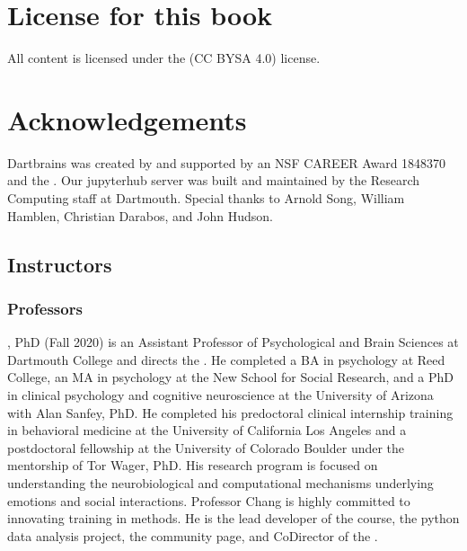 \documentclass[letterpaper,10pt,english]{sphinxmanual}
\let\sphinxpxdimen\pdfpxdimen\else\newdimen\sphinxpxdimen
\begin{document}
\chapter{License for this book}
\label{\detokenize{content/intro:license-for-this-book}}
All content is licensed under the 
(CC BY\sphinxhyphen{}SA 4.0) license.


\chapter{Acknowledgements}
\label{\detokenize{content/intro:acknowledgements}}
Dartbrains was created by  and supported by an NSF CAREER Award 1848370 and the . Our jupyterhub server was built and maintained by the Research Computing staff at Dartmouth. Special thanks to Arnold Song, William Hamblen, Christian Darabos, and John Hudson.


\section{Instructors}
\label{\detokenize{content/Instructors:instructors}}\label{\detokenize{content/Instructors::doc}}

\subsection{Professors}
\label{\detokenize{content/Instructors:professors}}
\noindent\sphinxincludegraphics[width=200\sphinxpxdimen]{{chang}.jpg}

, PhD (Fall 2020) is an Assistant Professor of Psychological and Brain Sciences at Dartmouth College and directs the . He completed a BA in psychology at Reed College, an MA in psychology at the New School for Social Research, and a PhD in clinical psychology and cognitive neuroscience at the University of Arizona with Alan Sanfey, PhD. He completed his predoctoral clinical internship training in behavioral medicine at the University of California Los Angeles and a postdoctoral fellowship at the University of Colorado Boulder under the mentorship of Tor Wager, PhD. His research program is focused on understanding the neurobiological and computational mechanisms underlying emotions and social interactions. Professor Chang is highly committed to innovating training in methods. He is the lead developer of the  course, the  python data analysis project, the  community page, and Co\sphinxhyphen{}Director of the .
\end{document}
